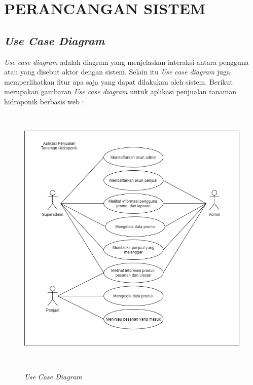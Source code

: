 \section{\uppercase{Perancangan Sistem}}

\subsection{\textit{Use Case Diagram}}
\textit{Use case diagram} adalah diagram yang menjelaskan interaksi antara pengguna atau yang disebut aktor dengan sistem. Selain itu \textit{Use case diagram} juga memperlihatkan fitur apa saja yang dapat dilakukan oleh sistem. Berikut merupakan gambaran \textit{Use case diagram} untuk aplikasi penjualan tanaman hidroponik berbasis web :

\begin{figure}[H]
	\centering
	{\includegraphics [width = 13cm, height= 13cm]{gambar/use_case_diagram}}
	\caption{\textit{Use Case Diagram}}
	\label{use_case_diagram}
\end{figure}


